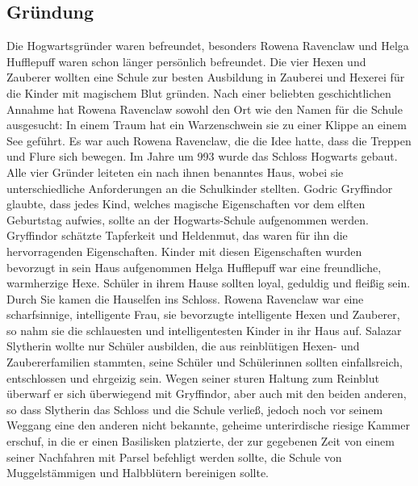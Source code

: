 \documentclass[a4paper, 10pt]{article}
\begin{document}
\subsection*{\Large Gründung}
Die Hogwartsgründer waren befreundet, besonders Rowena Ravenclaw und Helga Hufflepuff waren schon länger persönlich befreundet. Die vier Hexen und Zauberer wollten eine Schule zur besten Ausbildung in Zauberei und Hexerei für die Kinder mit magischem Blut gründen. Nach einer beliebten geschichtlichen Annahme hat Rowena Ravenclaw sowohl den Ort wie den Namen für die Schule ausgesucht: In einem Traum hat ein Warzenschwein sie zu einer Klippe an einem See geführt. Es war auch Rowena Ravenclaw, die die Idee hatte, dass die Treppen und Flure sich bewegen.
\vspace{10pt}
\newline
{}  
Im Jahre um 993 wurde das Schloss Hogwarts gebaut. Alle vier Gründer leiteten ein nach ihnen benanntes Haus, wobei sie unterschiedliche Anforderungen an die Schulkinder stellten. Godric Gryffindor glaubte, dass jedes Kind, welches magische Eigenschaften vor dem elften Geburtstag aufwies, sollte an der Hogwarts-Schule aufgenommen werden. Gryffindor schätzte Tapferkeit und Heldenmut, das waren für ihn die hervorragenden Eigenschaften. Kinder mit diesen Eigenschaften wurden bevorzugt in sein Haus aufgenommen
\vspace{10pt}
\newline
{}  
Helga Hufflepuff war eine freundliche, warmherzige Hexe. Schüler in ihrem Hause sollten loyal, geduldig und fleißig sein. Durch Sie kamen die Hauselfen ins Schloss.
\vspace{10pt}
\newline
{}  
Rowena Ravenclaw war eine scharfsinnige, intelligente Frau, sie bevorzugte intelligente Hexen und Zauberer, so nahm sie die schlauesten und intelligentesten Kinder in ihr Haus auf.
\vspace{10pt}
\newline
{}  
Salazar Slytherin wollte nur Schüler ausbilden, die aus reinblütigen Hexen- und Zaubererfamilien stammten, seine Schüler und Schülerinnen sollten einfallsreich, entschlossen und ehrgeizig sein. Wegen seiner sturen Haltung zum Reinblut überwarf er sich überwiegend mit Gryffindor, aber auch mit den beiden anderen, so dass Slytherin das Schloss und die Schule verließ, jedoch noch vor seinem Weggang eine den anderen nicht bekannte, geheime unterirdische riesige Kammer erschuf, in die er einen Basilisken platzierte, der zur gegebenen Zeit von einem seiner Nachfahren mit Parsel befehligt werden sollte, die Schule von Muggelstämmigen und Halbblütern bereinigen sollte.
\end{document}

